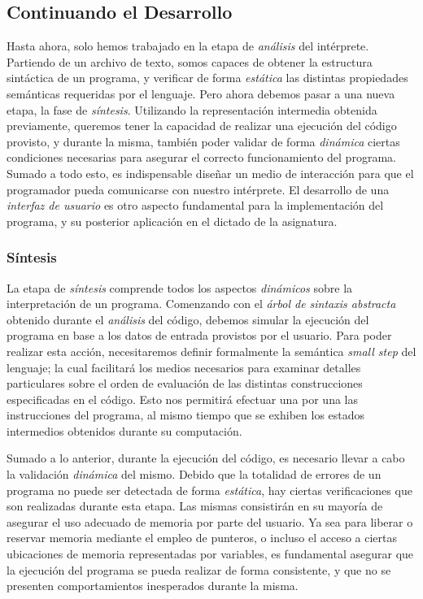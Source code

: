 \subsection{Continuando el Desarrollo}

Hasta ahora, solo hemos trabajado en la etapa de \textit{análisis} del intérprete.
Partiendo de un archivo de texto, somos capaces de obtener la estructura sintáctica de un programa, y verificar de forma \textit{estática} las distintas propiedades semánticas requeridas por el lenguaje.
Pero ahora debemos pasar a una nueva etapa, la fase de \textit{síntesis}.
Utilizando la representación intermedia obtenida previamente, queremos tener la capacidad de realizar una ejecución del código provisto, y durante la misma, también poder validar de forma \textit{dinámica} ciertas condiciones necesarias para asegurar el correcto funcionamiento del programa.
Sumado a todo esto, es indispensable diseñar un medio de interacción para que el programador pueda comunicarse con nuestro intérprete.
El desarrollo de una \textit{interfaz de usuario} es otro aspecto fundamental para la implementación del programa, y su posterior aplicación en el dictado de la asignatura.

\subsubsection{Síntesis}

La etapa de \textit{síntesis} comprende todos los aspectos \textit{dinámicos} sobre la interpretación de un programa.
Comenzando con el \textit{árbol de sintaxis abstracta} obtenido durante el \textit{análisis} del código, debemos simular la ejecución del programa en base a los datos de entrada provistos por el usuario.
Para poder realizar esta acción, necesitaremos definir formalmente la semántica \textit{small step} del lenguaje; la cual facilitará los medios necesarios para examinar detalles particulares sobre el orden de evaluación de las distintas construcciones especificadas en el código.
Esto nos permitirá efectuar una por una las instrucciones del programa, al mismo tiempo que se exhiben los estados intermedios obtenidos durante su computación.

Sumado a lo anterior, durante la ejecución del código, es necesario llevar a cabo la validación \textit{dinámica} del mismo.
Debido que la totalidad de errores de un programa no puede ser detectada de forma \textit{estática}, hay ciertas verificaciones que son realizadas durante esta etapa.
Las mismas consistirán en su mayoría de asegurar el uso adecuado de memoria por parte del usuario.
Ya sea para liberar o reservar memoria mediante el empleo de punteros, o incluso el acceso a ciertas ubicaciones de memoria representadas por variables, es fundamental asegurar que la ejecución del programa se pueda realizar de forma consistente, y que no se presenten comportamientos inesperados durante la misma.

